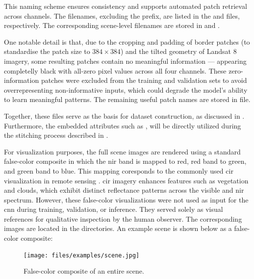 {This naming scheme ensures consistency and supports automated patch retrieval across channels.
The filenames, excluding the  prefix, are listed in the  and  files, respectively.
The corresponding scene-level filenames are stored in  and .

One notable detail is that, due to the cropping and padding of border patches (to standardise the patch size to \ensuremath{384\times384}) and the tilted geometry of Landsat 8 imagery,
some resulting patches contain no meaningful information --- appearing completelly black with all-zero pixel values across all four channels.
These zero-information patches were excluded from the training and validation sets to avoid overrepresenting non-informative inputs,
which could degrade the model's ability to learn meaningful patterns.
The remaining useful patch names are stored in  file.

Together, these  files serve as the basis for dataset construction, as discussed in .
Furthermore, the embedded attributes such as ,  will be directly utilized during the stitching process described in .

For visualization purposes, the full scene images are rendered using a standard false-color composite in which the \gls{nir} band is mapped to red, red band to green, and green band to blue.
This mapping coresponds to the commonly used \gls{cir} visualization in remote sensing \cite{cir1}.
\gls{cir} imagery enhances features such as vegetation and clouds, which exhibit distinct reflectance patterns across the visible and \gls{nir} spectrum.
However, these false-color visualizations were not used as input for the \gls{cnn} during training, validation, or inference.
They served solely as visual references for qualitative inspection by the human observer.
The corresponding images are located in the  directories.
An example scene is shown below as a false-color composite: 

\begin{figure}[H]
  \centering
  \texttt{[image: files/examples/scene.jpg]}
  \caption{False-color composite of an entire scene.}
  \label{fig:false_color_scene}
\end{figure}

}
